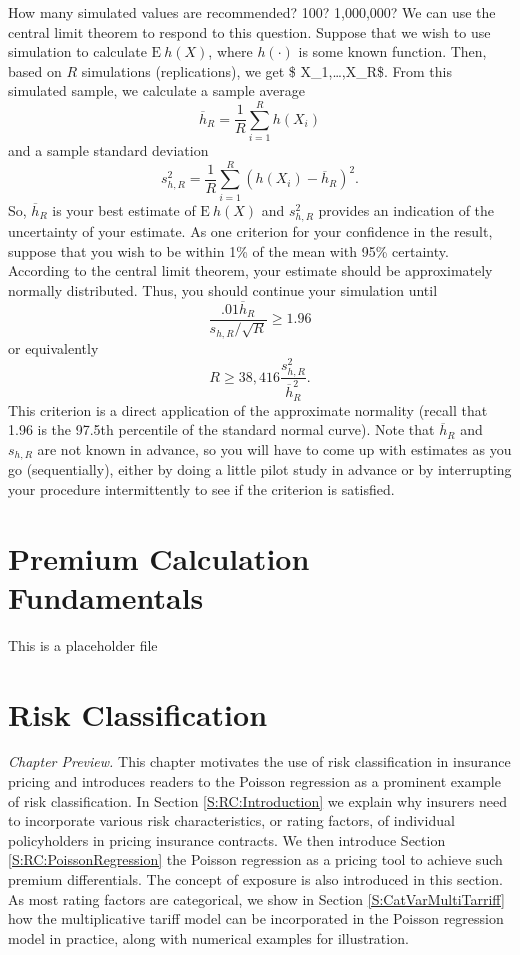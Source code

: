 \documentclass[]{book}
\theoremstyle{definition}
\theoremstyle{definition}
\theoremstyle{definition}
\theoremstyle{remark}
\begin{document}
How many simulated values are recommended? 100? 1,000,000? We can use
the central limit theorem to respond to this question. Suppose that we
wish to use simulation to calculate \(\mathrm{E~}h(X)\), where
\(h(\cdot)\) is some known function. Then, based on \(R\) simulations
(replications), we get \$ X\_1,\ldots,X\_R\$. From this simulated
sample, we calculate a sample average
\[\overline{h}_R=\frac{1}{R}\sum_{i=1}^{R} h(X_i)\] and a sample
standard deviation
\[s_{h,R}^2 = \frac{1}{R} \sum_{i=1}^{R}\left( h(X_i) -\overline{h}_R
\right) ^2.\] So, \(\overline{h}_R\) is your best estimate of
\(\mathrm{E~}h(X)\) and \(s_{h,R}^2\) provides an indication of the
uncertainty of your estimate. As one criterion for your confidence in
the result, suppose that you wish to be within 1\% of the mean with 95\%
certainty. According to the central limit theorem, your estimate should
be approximately normally distributed. Thus, you should continue your
simulation until \[\frac{.01\overline{h}_R}{s_{h,R}/\sqrt{R}}\geq 1.96\]
or equivalently \[R \geq 38,416\frac{s_{h,R}^2}{\overline{h}_R^2}.\]
This criterion is a direct application of the approximate normality
(recall that 1.96 is the 97.5th percentile of the standard normal
curve). Note that \(\overline{h}_R\) and \(s_{h,R}\) are not known in
advance, so you will have to come up with estimates as you go
(sequentially), either by doing a little pilot study in advance or by
interrupting your procedure intermittently to see if the criterion is
satisfied.

\chapter{Premium Calculation Fundamentals}\label{C:PremCalc}

This is a placeholder file

\chapter{Risk Classification}\label{C:RiskClass}

\emph{Chapter Preview.} This chapter motivates the use of risk
classification in insurance pricing and introduces readers to the
Poisson regression as a prominent example of risk classification. In
Section \ref{S:RC:Introduction} we explain why insurers need to
incorporate various risk characteristics, or rating factors, of
individual policyholders in pricing insurance contracts. We then
introduce Section \ref{S:RC:PoissonRegression} the Poisson regression as
a pricing tool to achieve such premium differentials. The concept of
exposure is also introduced in this section. As most rating factors are
categorical, we show in Section \ref{S:CatVarMultiTarriff} how the
multiplicative tariff model can be incorporated in the Poisson
regression model in practice, along with numerical examples for
illustration.
\end{document}
